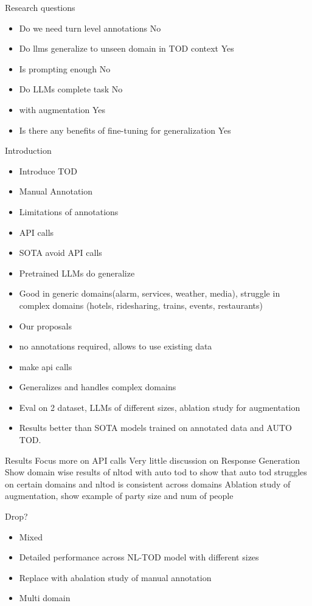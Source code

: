 

Research questions
\begin{itemize}
\item Do we need turn level annotations No
\item Do llms generalize to unseen domain in TOD context Yes
\item Is prompting enough No
\item Do LLMs complete task No
\item with augmentation Yes
\item Is there any benefits of fine-tuning for generalization Yes

\end{itemize}

Introduction
\begin{itemize}
    \item Introduce TOD
    \item Manual Annotation
    \item Limitations of annotations
    \item API calls
    \item SOTA avoid API calls
    \item Pretrained LLMs do generalize
    \item Good in generic domains(alarm, services, weather, media), struggle in complex domains (hotels, ridesharing, trains, events, restaurants)
    \item Our proposals
    \item no annotations required, allows to use existing data
    \item make api calls
    \item Generalizes and handles complex domains
    \item Eval on 2 dataset, LLMs of different sizes, ablation study for augmentation
    \item Results better than SOTA models trained on annotated data and AUTO TOD.
\end{itemize}

Results
Focus more on API calls
Very little discussion on Response Generation
Show domain wise results of nltod with auto tod to show that auto tod struggles on certain domains and nltod is consistent across domains
Ablation study of augmentation, show example of party size and num of people 


Drop?
\begin{itemize}
    \item Mixed
    \item Detailed performance across NL-TOD model with different sizes
    \item Replace with abalation study of manual annotation
    \item Multi domain
\end{itemize}